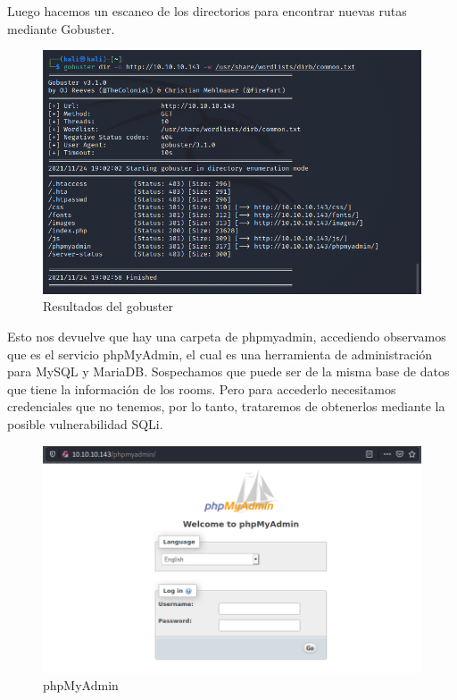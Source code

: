 \documentclass{article}
\begin{document}
Luego hacemos un escaneo de los directorios para encontrar nuevas rutas mediante Gobuster.
\begin{figure}[H]
	\center
	\includegraphics[width=\textwidth]{images/jarvis/4.png}
	\caption{Resultados del gobuster}
\end{figure}

Esto nos devuelve que hay una carpeta de phpmyadmin, accediendo observamos que es el servicio phpMyAdmin, el cual es una herramienta de administración para MySQL y MariaDB. Sospechamos que puede ser de la misma base de datos que tiene la información de los rooms. Pero para accederlo necesitamos credenciales que no tenemos, por lo tanto, trataremos de obtenerlos mediante la posible vulnerabilidad SQLi.
\begin{figure}[H]
	\center
	\includegraphics[width=\textwidth]{images/jarvis/5.png}
	\caption{phpMyAdmin}
\end{figure}
\end{document}
